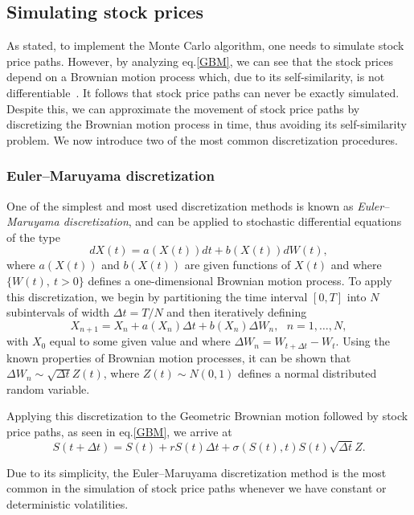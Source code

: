 \subsection{Simulating stock prices}
\label{subsection:Simulating stock prices}
As stated, to implement the Monte Carlo algorithm, one needs to simulate stock price paths. However, by analyzing eq.\eqref{GBM}, we can see that the stock prices depend on a Brownian motion process which, due to its self-similarity, is not differentiable~\citep{Mikosch}. It follows that stock price paths can never be exactly simulated. Despite this, we can approximate the movement of stock price paths by discretizing the Brownian motion process in time, thus avoiding its self-similarity problem. We now introduce two of the most common discretization procedures.

\subsubsection{Euler–Maruyama discretization}
One of the simplest and most used discretization methods is known as \emph{Euler–Maruyama discretization}, and can be applied to stochastic differential equations of the type
\begin{equation}\label{SDE}
dX(t)=a(X(t))dt+b(X(t))dW(t),
\end{equation}
\noindent where $a(X(t))$ and $b(X(t))$ are given functions of $X(t)$ and where $\{W(t),\ t>0\}$ defines a one-dimensional Brownian motion process.
To apply this discretization, we begin by partitioning the time interval $[0,T]$ into $N$ subintervals of width $\Delta t=T/N$ and then iteratively defining
\begin{equation}
X_{n+1}=X_n+a(X_n)\Delta t+b(X_n)\Delta W_n,\ \ \ n=1,\ldots,N,
\end{equation}
\noindent with $X_{0}$ equal to some given value and where $\Delta W_n=W_{t+\Delta t}-W_{t}$.
Using the known properties of Brownian motion processes, it can be shown that $\Delta W_n\sim \sqrt{\Delta t}Z(t)$, where $Z(t)\sim N(0,1)$ defines a normal distributed random variable.

Applying this discretization to the Geometric Brownian motion followed by stock price paths, as seen in eq.\eqref{GBM}, we arrive at
\begin{equation}
S(t+\Delta t)=S(t)+rS(t)\Delta t+\sigma(S(t),t)S(t)\sqrt{\Delta t}Z.
\end{equation}

Due to its simplicity, the Euler–Maruyama discretization method is the most common in the simulation of stock price paths whenever we have constant or deterministic volatilities.


